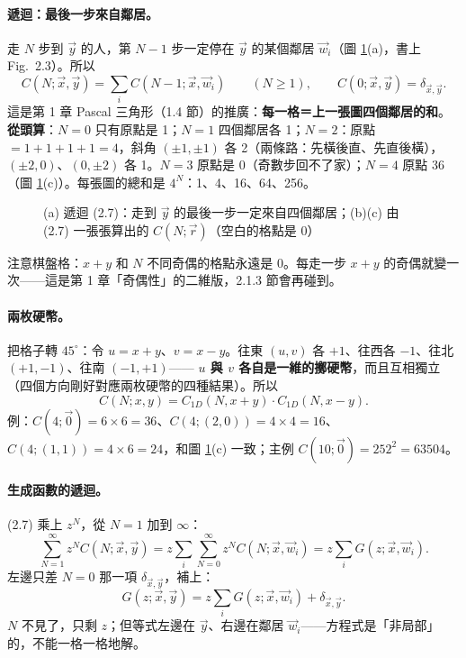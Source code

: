\paragraph{遞迴：最後一步來自鄰居。}
走 $N$ 步到 $\vec y$ 的人，第 $N-1$ 步一定停在 $\vec y$ 的某個鄰居 $\vec w_i$（圖 \ref{twofig-countgrid}(a)，書上 Fig.~2.3）。所以
\[C(N;\vec x,\vec y)=\sum_iC(N-1;\vec x,\vec w_i)\qquad(N\ge1),\qquad C(0;\vec x,\vec y)=\delta_{\vec x,\vec y}.\tag{2.7}\]
這是第 1 章 Pascal 三角形（1.4 節）的推廣：\textbf{每一格＝上一張圖四個鄰居的和}。
\textbf{從頭算}：$N=0$ 只有原點是 1；$N=1$ 四個鄰居各 1；$N=2$：原點 $=1+1+1+1=4$，斜角 $(\pm1,\pm1)$ 各 2（兩條路：先橫後直、先直後橫），
$(\pm2,0)$、$(0,\pm2)$ 各 1。$N=3$ 原點是 0（奇數步回不了家）；$N=4$ 原點 36（圖 \ref{twofig-countgrid}(c)）。每張圖的總和是 $4^N$：1、4、16、64、256。
\begin{figure}[H]
\centering
\TwoFigCountGrid
\caption{(a) 遞迴 (2.7)：走到 $\vec y$ 的最後一步一定來自四個鄰居；(b)(c) 由 (2.7) 一張張算出的 $C(N;\vec r)$（空白的格點是 0）}\label{twofig-countgrid}
\end{figure}
注意棋盤格：$x+y$ 和 $N$ 不同奇偶的格點永遠是 0。每走一步 $x+y$ 的奇偶就變一次——這是第 1 章「奇偶性」的二維版，2.1.3 節會再碰到。

\paragraph{兩枚硬幣。}
把格子轉 $45^\circ$：令 $u=x+y$、$v=x-y$。往東 $(u,v)$ 各 $+1$、往西各 $-1$、往北 $(+1,-1)$、往南 $(-1,+1)$——
\textbf{$u$ 與 $v$ 各自是一維的擲硬幣}，而且互相獨立（四個方向剛好對應兩枚硬幣的四種結果）。所以
\[C(N;x,y)=C_{1D}(N,x+y)\cdot C_{1D}(N,x-y).\]
例：$C(4;\vec0)=6\times6=36$、$C(4;(2,0))=4\times4=16$、$C(4;(1,1))=4\times6=24$，和圖 \ref{twofig-countgrid}(c) 一致；主例 $C(10;\vec0)=252^2=63504$。

\paragraph{生成函數的遞迴。}
(2.7) 乘上 $z^N$，從 $N=1$ 加到 $\infty$：
\[\sum_{N=1}^\infty z^NC(N;\vec x,\vec y)=z\sum_i\sum_{N=0}^\infty z^NC(N;\vec x,\vec w_i)=z\sum_iG(z;\vec x,\vec w_i).\tag{2.8}\]
左邊只差 $N=0$ 那一項 $\delta_{\vec x,\vec y}$，補上：
\[G(z;\vec x,\vec y)=z\sum_iG(z;\vec x,\vec w_i)+\delta_{\vec x,\vec y}.\tag{2.9}\]
$N$ 不見了，只剩 $z$；但等式左邊在 $\vec y$、右邊在鄰居 $\vec w_i$——方程式是「非局部」的，不能一格一格地解。

